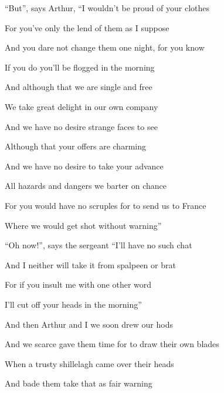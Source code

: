 \documentclass[letterpaper,10pt,english]{sphinxmanual}
\begin{document}
\begin{DUlineblock}{0em}
\item[] “But”, says Arthur, “I wouldn’t be proud of your clothes
\item[] For you’ve only the lend of them as I suppose
\item[] And you dare not change them one night, for you know
\item[] If you do you’ll be flogged in the morning
\end{DUlineblock}

\begin{DUlineblock}{0em}
\item[] And although that we are single and free
\item[] We take great delight in our own company
\item[] And we have no desire strange faces to see
\item[] Although that your offers are charming
\end{DUlineblock}

\begin{DUlineblock}{0em}
\item[] And we have no desire to take your advance
\item[] All hazards and dangers we barter on chance
\item[] For you would have no scruples for to send us to France
\item[] Where we would get shot without warning”
\end{DUlineblock}

\begin{DUlineblock}{0em}
\item[] “Oh now!”, says the sergeant “I’ll have no such chat
\item[] And I neither will take it from spalpeen or brat
\item[] For if you insult me with one other word
\item[] I’ll cut off your heads in the morning”
\end{DUlineblock}

\begin{DUlineblock}{0em}
\item[] And then Arthur and I we soon drew our hods
\item[] And we scarce gave them time for to draw their own blades
\item[] When a trusty shillelagh came over their heads
\item[] And bade them take that as fair warning
\end{DUlineblock}
\end{document}

